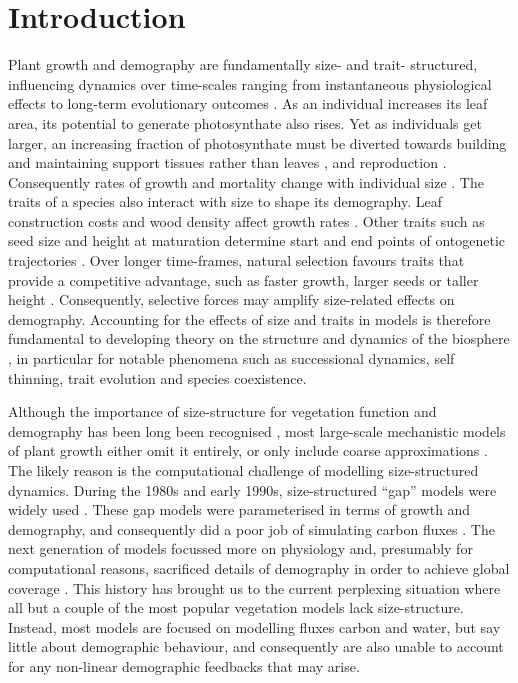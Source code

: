 \documentclass[a4paper,11pt]{article}
\begin{document}
\section{Introduction}\label{introduction}

Plant growth and demography are fundamentally size- and trait- structured,
influencing dynamics over time-scales ranging from instantaneous physiological
effects to long-term evolutionary outcomes \citep{Harper-1977, Westoby-2002}. As
an individual increases its leaf area, its potential to generate
photosynthate also rises. Yet as individuals get larger, an increasing
fraction of photosynthate must be diverted towards
building and maintaining support tissues rather than leaves
\citep{Givnish-1988, Enquist-2007}, and reproduction \citep{Thomas-2011}. Consequently 
rates of growth and mortality change with individual size
\citep{Muller-2006, Thomas-2011, Ruger-2011, Wright-2010}. The traits of
a species also interact with size to shape its demography. Leaf
construction costs and wood density affect growth rates
\citep{Wright-2010}. Other traits such as seed size and height at
maturation determine start and end points of ontogenetic trajectories
\citep{Westoby-2002}. Over longer time-frames, natural selection favours
traits that provide a competitive advantage, such as faster growth, larger
seeds or taller height \citep{Falster-2003}. Consequently, selective forces may amplify size-related effects on demography. Accounting for the effects of size and traits in models is therefore fundamental to developing theory on the structure and dynamics of the biosphere
\citep{Purves-2008, Moorcroft-2001, Falster-2003}, in particular for notable
phenomena such as successional dynamics, self thinning, trait evolution
and species coexistence.

Although the importance of size-structure for vegetation function and
demography has been long been recognised
\citep{Harper-1977, Hara-1984, Shugart-1980, Huston-1987, Moorcroft-2001,
Kohyama-1993, Enquist-2007, Pacala-1996, Coomes-2007},
most large-scale mechanistic models of plant growth either omit it
entirely, or only include coarse approximations
\citep{Cramer-2001, Dekauwe-2014, Kelley-2013, Sitch-2003}. The likely
reason is the computational
challenge of modelling size-structured dynamics. During the 1980s and
early 1990s, size-structured ``gap'' models were widely used
\citep[e.g.][]{Huston-1987, Shugart-1980}. These gap models were
parameterised in terms of growth and demography, and consequently did a
poor job of simulating carbon fluxes . The next generation of models
focussed more on physiology and, presumably for computational reasons,
sacrificed details of demography in order to achieve global coverage
\citep{Haxeltine-1996}. This history has brought us to the
current perplexing situation where all but a couple
\citep{Moorcroft-2001, Smith-2014} of the most popular vegetation
models lack size-structure. Instead, most models
are focused on modelling fluxes carbon and water, but say little about
demographic behaviour, and consequently are also unable to account for
any non-linear demographic feedbacks that may arise.
\end{document}
